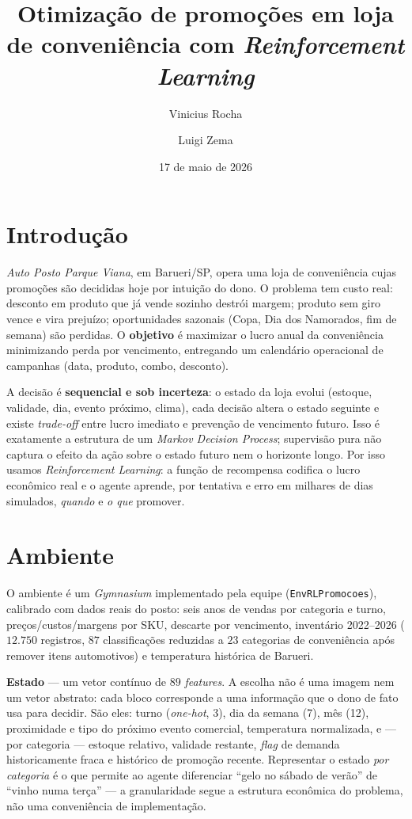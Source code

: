\documentclass[9pt,a4paper,twoside]{tau}
\title{Otimização de promoções em loja de conveniência com \textit{Reinforcement Learning}}
\author[a]{Vinicius Rocha}
\author[a]{Luigi Zema}
\affil[a]{Insper Instituto de Ensino e Pesquisa}
\date{17 de maio de 2026}
\begin{document}
	\maketitle
	\thispagestyle{firststyle}
	\tauabstract


\section{Introdução}

 \textit{Auto Posto Parque Viana}, em Barueri/SP, opera uma loja
de conveniência cujas promoções são decididas hoje por intuição do dono. O
problema tem custo real: desconto em produto que já vende sozinho destrói
margem; produto sem giro vence e vira prejuízo; oportunidades sazonais
(Copa, Dia dos Namorados, fim de semana) são perdidas. O \textbf{objetivo}
é maximizar o lucro anual da conveniência minimizando perda por vencimento,
entregando um calendário operacional de campanhas (data, produto, combo,
desconto).

A decisão é \textbf{sequencial e sob incerteza}: o estado da loja evolui
(estoque, validade, dia, evento próximo, clima), cada decisão altera o
estado seguinte e existe \textit{trade-off} entre lucro imediato e prevenção
de vencimento futuro. Isso é exatamente a estrutura de um \textit{Markov
Decision Process}; supervisão pura não captura o efeito da ação sobre o
estado futuro nem o horizonte longo. Por isso usamos \textit{Reinforcement
Learning}: a função de recompensa codifica o lucro econômico real e o agente
aprende, por tentativa e erro em milhares de dias simulados, \textit{quando}
e \textit{o que} promover.

\section{Ambiente}

O ambiente é um \textit{Gymnasium} implementado pela equipe
(\texttt{EnvRLPromocoes}), calibrado com dados reais do posto: seis anos de
vendas por categoria e turno, preços/custos/margens por SKU, descarte por
vencimento, inventário 2022--2026 (\(12{.}750\) registros, \(87\)
classificações reduzidas a \(23\) categorias de conveniência após remover
itens automotivos) e temperatura histórica de Barueri.

\textbf{Estado} --- um vetor contínuo de \(89\) \textit{features}. A escolha
não é uma imagem nem um vetor abstrato: cada bloco corresponde a uma
informação que o dono de fato usa para decidir. São eles: turno
(\textit{one-hot}, 3), dia da semana (7), mês (12), proximidade e tipo do
próximo evento comercial, temperatura normalizada, e --- por categoria ---
estoque relativo, validade restante, \textit{flag} de demanda
historicamente fraca e histórico de promoção recente. Representar o estado
\textit{por categoria} é o que permite ao agente diferenciar ``gelo no
sábado de verão'' de ``vinho numa terça'' --- a granularidade segue a
estrutura econômica do problema, não uma conveniência de implementação.
\end{document}
